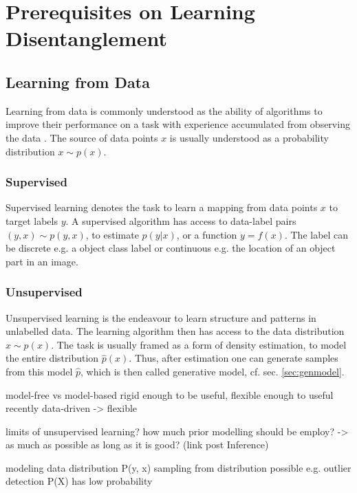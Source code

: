 \chapter{Prerequisites on Learning Disentanglement}

\section{Learning from Data}
	{Learning from data} is commonly understood as the ability of algorithms to improve their performance on a task with experience accumulated from observing the data \cite{goodfellow16dlb}. The source of data points $x$ is usually understood as a probability distribution $x \sim p(x)$.
	\subsection{Supervised}
	{Supervised learning} denotes the task to learn a mapping from data points $x$ to target labels $y$. A supervised algorithm has access to data-label pairs  $(y, x) \sim p(y, x)$, to estimate $p(y|x)$, or a function $y = f(x)$.
	The label can be discrete e.g. a object class label or continuous e.g. the location of an object part in an image.

	\subsection{Unsupervised}
		{Unsupervised learning} is the endeavour to learn structure and patterns in unlabelled data. The learning algorithm then has access to the data distribution $x \sim p(x)$. The task is usually framed as a form of density estimation, to model the entire distribution $\hat p(x)$. Thus, after estimation one can generate samples from this model $\hat p$, which is then called generative model, cf. sec. \ref{sec:genmodel}.

		model-free vs model-based
		rigid enough to be useful, flexible enough to useful
		recently data-driven -> flexible

		limits of unsupervised learning?
		how much prior modelling should be employ?
		-> as much as possible as long as it is good? (link post Inference)

		modeling data distribution P(y, x)
		sampling from distribution possible
		e.g. outlier detection P(X) has low probability

